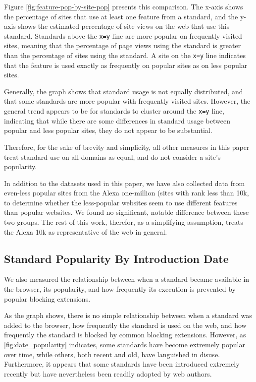 Figure \ref{fig:feature-pop-by-site-pop} presents this comparison.
The x-axis shows the percentage of sites that use at least one feature from a
standard, and the y-axis shows the estimated percentage of site views on the
web that use this standard.  Standards above the \texttt{x=y} line are more
popular on frequently visited sites, meaning that the percentage of page views
using the standard is greater than the percentage of sites using the standard.
A site on the \texttt{x=y} line indicates that the feature is used exactly as
frequently on popular sites as on less popular sites.

Generally, the graph shows that standard usage is not equally distributed, and
that some standards are more popular with frequently visited sites.  However,
the general trend appears to be for standards to cluster around the
\texttt{x=y} line, indicating that while there are some differences in standard
usage between popular and less popular sites, they do not appear to be
substantial.

Therefore, for the sake of brevity and simplicity, all other measures in this
paper treat standard use on all domains as equal, and do not consider a site's
popularity.

In addition to the datasets used in this paper, we have also collected data
from even-less popular sites from the Alexa one-million (sites with rank less
than 10k, to determine whether the less-popular websites seem to use different
features than popular websites.  We found no significant, notable difference
between these two groups.  The rest of this work, therefor, as a simplifying
assumption, treats the Alexa 10k as representative of the web in general.


\subsection{Standard Popularity By Introduction Date}


We also measured the relationship between when a standard became available in
the browser, its popularity, and how frequently its execution is prevented by
popular blocking extensions.

As the graph shows, there is no simple relationship between when a standard was
added to the browser, how frequently the standard is used on the web, and how
frequently the standard is blocked by common blocking extensions.  However, as
\ref{fig:date_popularity} indicates, some standards have become extremely
popular over time, while others, both recent and old, have languished in
disuse. Furthermore, it appears that some standards have been introduced
extremely recently but have nevertheless been readily adopted by web authors.

